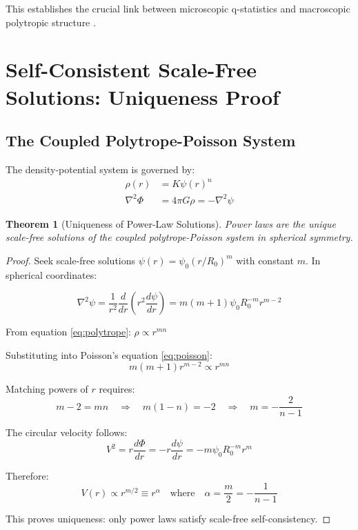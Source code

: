 \documentclass[12pt, a4paper]{article}
\newtheorem{theorem}{Theorem}
\theoremstyle{definition}
\theoremstyle{remark}
\begin{document}
This establishes the crucial link between microscopic q-statistics and macroscopic polytropic structure \cite{Plastino1993, Chavanis2002}.

\section{Self-Consistent Scale-Free Solutions: Uniqueness Proof}

\subsection{The Coupled Polytrope-Poisson System}

The density-potential system is governed by:
\begin{align}
\rho(r) &= K\psi(r)^n \label{eq:polytrope}\\
\nabla^2\Phi &= 4\pi G\rho = -\nabla^2\psi \label{eq:poisson}
\end{align}

\begin{theorem}[Uniqueness of Power-Law Solutions]
Power laws are the unique scale-free solutions of the coupled polytrope-Poisson system in spherical symmetry.
\end{theorem}

\begin{proof}
Seek scale-free solutions $\psi(r) = \psi_0(r/R_0)^m$ with constant $m$. In spherical coordinates:

\begin{equation}
\nabla^2\psi = \frac{1}{r^2}\frac{d}{dr}\left(r^2\frac{d\psi}{dr}\right) = m(m+1)\psi_0 R_0^{-m}r^{m-2}
\end{equation}

From equation \eqref{eq:polytrope}: $\rho \propto r^{mn}$

Substituting into Poisson's equation \eqref{eq:poisson}:
\begin{equation}
m(m+1)r^{m-2} \propto r^{mn}
\end{equation}

Matching powers of $r$ requires:
\begin{equation}
m - 2 = mn \quad \Rightarrow \quad m(1-n) = -2 \quad \Rightarrow \quad \boxed{m = -\frac{2}{n-1}}
\end{equation}

The circular velocity follows:
\begin{equation}
V^2 = r\frac{d\Phi}{dr} = -r\frac{d\psi}{dr} = -m\psi_0 R_0^{-m}r^m
\end{equation}

Therefore:
\begin{equation}
V(r) \propto r^{m/2} \equiv r^\alpha \quad \text{where} \quad \boxed{\alpha = \frac{m}{2} = -\frac{1}{n-1}}
\end{equation}

This proves uniqueness: only power laws satisfy scale-free self-consistency.
\end{proof}
\end{document}
